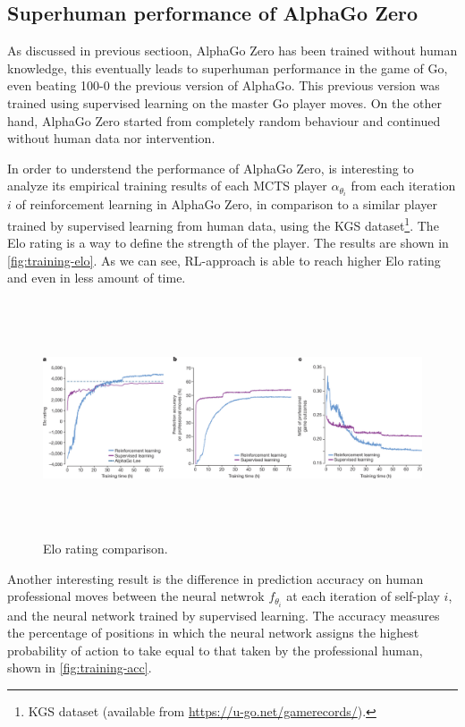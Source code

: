 \documentclass{article}
\begin{document}
\subsection{Superhuman performance of AlphaGo Zero}
As discussed in previous sectioon, AlphaGo Zero has been trained without human knowledge, this eventually leads to superhuman performance in the game of Go, even beating 100-0 the previous version of AlphaGo. This previous version was trained using supervised learning on the master Go player moves. On the other hand, AlphaGo Zero started from completely random behaviour and continued without human data nor intervention.

In order to understend the performance of AlphaGo Zero, is interesting to analyze its empirical training results of each MCTS player $\alpha_{\theta_i}$ from each iteration $i$ of reinforcement learning in AlphaGo Zero, in comparison to a similar player trained by supervised learning from human data, using the KGS dataset\footnote{KGS dataset (available from \url{https://u-go.net/gamerecords/}).}. The Elo rating is a way to define the strength of the player. The results are shown in  \autoref{fig:training-elo}. As we can see, RL-approach is able to reach higher Elo rating and even in less amount of time.

\begin{figure}[H]
	\centering
	\includegraphics[height=7cm,trim={0px 0px 1425px 45px},clip]{alpha-go-zero_empirical_results.png}
	\caption{Elo rating comparison. \cite{Silver_2016}}
	\label{fig:training-elo}
\end{figure}

Another interesting result is the difference in prediction accuracy on human professional moves between the neural netwrok $f_{\theta_i}$ at each iteration of self-play $i$, and the neural network trained by supervised learning. The accuracy measures the percentage of positions in which the neural network assigns the highest probability of action to take equal to that taken by the professional human, shown in \autoref{fig:training-acc}.
\end{document}
